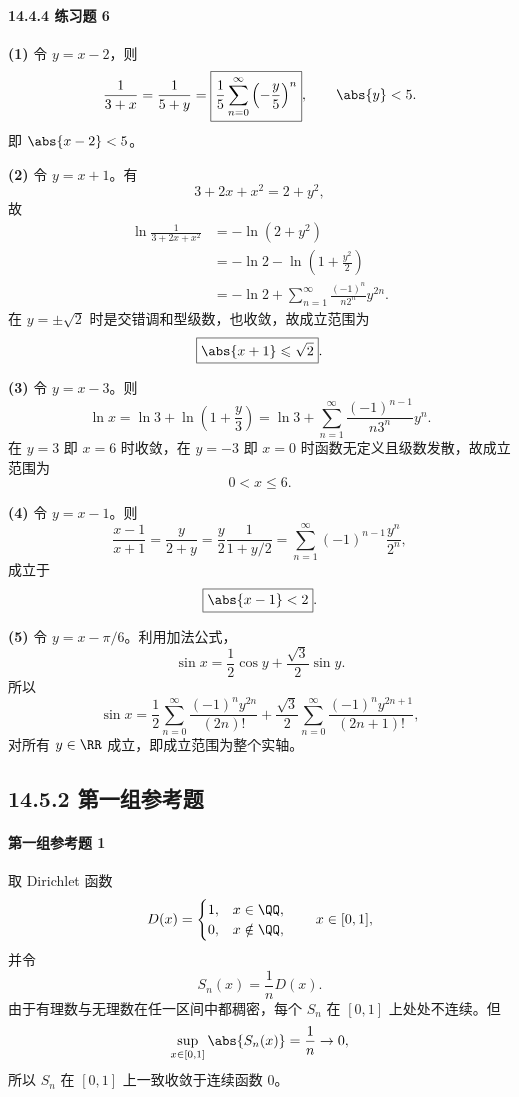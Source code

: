 \paragraph{14.4.4 练习题 6}
\begin{xsolution}
\textbf{(1)} 令 $y=x-2$，则
\[
  \frac1{3+x}=\frac1{5+y}
  =\boxed{\frac15\sum_{n=0}^{\infty}\left(-\frac y5\right)^n},
  \qquad \abs{y}<5.
\]
即 $\abs{x-2}<5$。

\textbf{(2)} 令 $y=x+1$。有
\[
  3+2x+x^2=2+y^2,
\]
故
\[
\begin{aligned}
  \ln\frac1{3+2x+x^2}
  &=-\ln(2+y^2)\\
  &=-\ln2-\ln\left(1+\frac{y^2}{2}\right)\\
  &=\boxed{-\ln2+
  \sum_{n=1}^{\infty}\frac{(-1)^n}{n2^n}y^{2n}}.
\end{aligned}
\]
在 $y=\pm\sqrt2$ 时是交错调和型级数，也收敛，故成立范围为
\[
  \boxed{\abs{x+1}\leqslant\sqrt2}.
\]

\textbf{(3)} 令 $y=x-3$。则
\[
  \ln x=\ln3+\ln\left(1+\frac y3\right)
  =\boxed{\ln3+
  \sum_{n=1}^{\infty}\frac{(-1)^{n-1}}{n3^n}y^n}.
\]
在 $y=3$ 即 $x=6$ 时收敛，在 $y=-3$ 即 $x=0$ 时函数无定义且级数发散，故成立范围为
\[
  \boxed{0<x\leqslant6}.
\]

\textbf{(4)} 令 $y=x-1$。则
\[
  \frac{x-1}{x+1}=\frac y{2+y}
  =\frac y2\frac1{1+y/2}
  =\boxed{\sum_{n=1}^{\infty}(-1)^{n-1}\frac{y^n}{2^n}},
\]
成立于
\[
  \boxed{\abs{x-1}<2}.
\]

\textbf{(5)} 令 $y=x-\pi/6$。利用加法公式，
\[
  \sin x=\frac12\cos y+\frac{\sqrt3}{2}\sin y.
\]
所以
\[
  \boxed{
  \sin x=
  \frac12\sum_{n=0}^{\infty}\frac{(-1)^n y^{2n}}{(2n)!}
  +\frac{\sqrt3}{2}\sum_{n=0}^{\infty}\frac{(-1)^n y^{2n+1}}{(2n+1)!}},
\]
对所有 $y\in\RR$ 成立，即成立范围为整个实轴。
\end{xsolution}

\subsection*{14.5.2 第一组参考题}

\paragraph{第一组参考题 1}
\begin{xsolution}
取 Dirichlet 函数
\[
  D(x)=
  \begin{cases}
    1,&x\in\QQ,\\
    0,&x\notin\QQ,
  \end{cases}
  \qquad x\in[0,1],
\]
并令
\[
  S_n(x)=\frac1nD(x).
\]
由于有理数与无理数在任一区间中都稠密，每个 $S_n$ 在 $[0,1]$ 上处处不连续。但
\[
  \sup_{x\in[0,1]}\abs{S_n(x)}=\frac1n\to0,
\]
所以 $S_n$ 在 $[0,1]$ 上一致收敛于连续函数 $0$。
\end{xsolution}

